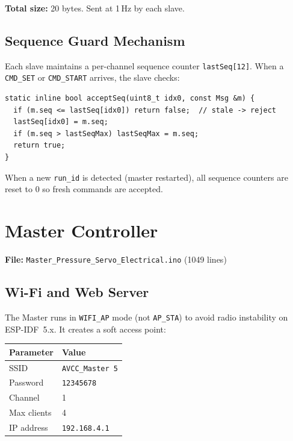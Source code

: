 \documentclass[11pt,a4paper]{article}
\begin{document}
\textbf{Total size:} 20 bytes. Sent at 1\,Hz by each slave.

\subsection{Sequence Guard Mechanism}

Each slave maintains a per-channel sequence counter \texttt{lastSeq[12]}. When a
\texttt{CMD\_SET} or \texttt{CMD\_START} arrives, the slave checks:

\begin{lstlisting}[style=cppstyle]
static inline bool acceptSeq(uint8_t idx0, const Msg &m) {
  if (m.seq <= lastSeq[idx0]) return false;  // stale -> reject
  lastSeq[idx0] = m.seq;
  if (m.seq > lastSeqMax) lastSeqMax = m.seq;
  return true;
}
\end{lstlisting}

When a new \texttt{run\_id} is detected (master restarted), all sequence
counters are reset to 0 so fresh commands are accepted.

\section{Master Controller}

\textbf{File:} \texttt{Master\_Pressure\_Servo\_Electrical.ino} (1049 lines)

\subsection{Wi-Fi and Web Server}

The Master runs in \texttt{WIFI\_AP} mode (not \texttt{AP\_STA}) to avoid radio
instability on ESP-IDF~5.x. It creates a soft access point:

\begin{center}
\begin{tabular}{ll}
\toprule
\textbf{Parameter} & \textbf{Value} \\
\midrule
SSID       & \texttt{AVCC\_Master 5} \\
Password   & \texttt{12345678} \\
Channel    & 1 \\
Max clients & 4 \\
IP address & \texttt{192.168.4.1} \\
\bottomrule
\end{tabular}
\end{center}
\end{document}

